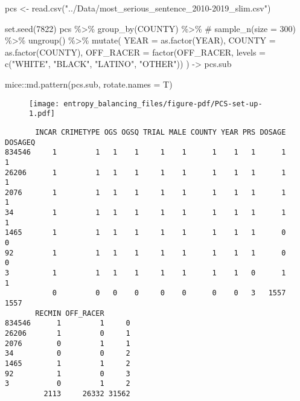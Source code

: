 \documentclass[
  letterpaper,
  DIV=11,
  numbers=noendperiod]{scrartcl}
\newenvironment{Shaded}{\begin{snugshade}}{\end{snugshade}}
\newcommand{\AttributeTok}[1]{\textcolor[rgb]{0.40,0.45,0.13}{#1}}
\newcommand{\CommentTok}[1]{\textcolor[rgb]{0.37,0.37,0.37}{#1}}
\newcommand{\DecValTok}[1]{\textcolor[rgb]{0.68,0.00,0.00}{#1}}
\newcommand{\FunctionTok}[1]{\textcolor[rgb]{0.28,0.35,0.67}{#1}}
\newcommand{\NormalTok}[1]{\textcolor[rgb]{0.00,0.23,0.31}{#1}}
\newcommand{\OtherTok}[1]{\textcolor[rgb]{0.00,0.23,0.31}{#1}}
\newcommand{\SpecialCharTok}[1]{\textcolor[rgb]{0.37,0.37,0.37}{#1}}
\newcommand{\StringTok}[1]{\textcolor[rgb]{0.13,0.47,0.30}{#1}}
\begin{document}
\begin{Shaded}
\begin{Highlighting}[]
\NormalTok{pcs }\OtherTok{\textless{}{-}} \FunctionTok{read.csv}\NormalTok{(}\StringTok{"../Data/most\_serious\_sentence\_2010{-}2019\_slim.csv"}\NormalTok{)}

\FunctionTok{set.seed}\NormalTok{(}\DecValTok{7822}\NormalTok{)}
\NormalTok{pcs }\SpecialCharTok{\%\textgreater{}\%}
    \FunctionTok{group\_by}\NormalTok{(COUNTY) }\SpecialCharTok{\%\textgreater{}\%}
    \CommentTok{\# sample\_n(size = 300) \%\textgreater{}\%}
    \FunctionTok{ungroup}\NormalTok{() }\SpecialCharTok{\%\textgreater{}\%}
    \FunctionTok{mutate}\NormalTok{(}
        \AttributeTok{YEAR =} \FunctionTok{as.factor}\NormalTok{(YEAR),}
        \AttributeTok{COUNTY =} \FunctionTok{as.factor}\NormalTok{(COUNTY),}
        \AttributeTok{OFF\_RACER =} \FunctionTok{factor}\NormalTok{(OFF\_RACER, }\AttributeTok{levels =} \FunctionTok{c}\NormalTok{(}\StringTok{"WHITE"}\NormalTok{, }\StringTok{"BLACK"}\NormalTok{, }\StringTok{"LATINO"}\NormalTok{, }\StringTok{"OTHER"}\NormalTok{))}
\NormalTok{        ) }\OtherTok{{-}\textgreater{}}\NormalTok{ pcs.sub}

\NormalTok{mice}\SpecialCharTok{::}\FunctionTok{md.pattern}\NormalTok{(pcs.sub, }\AttributeTok{rotate.names =}\NormalTok{ T)}
\end{Highlighting}
\end{Shaded}

\begin{figure}[H]

{\centering \texttt{[image: entropy\_balancing\_files/figure-pdf/PCS-set-up-1.pdf]}

}

\end{figure}

\begin{verbatim}
       INCAR CRIMETYPE OGS OGSQ TRIAL MALE COUNTY YEAR PRS DOSAGE DOSAGEQ
834546     1         1   1    1     1    1      1    1   1      1       1
26206      1         1   1    1     1    1      1    1   1      1       1
2076       1         1   1    1     1    1      1    1   1      1       1
34         1         1   1    1     1    1      1    1   1      1       1
1465       1         1   1    1     1    1      1    1   1      0       0
92         1         1   1    1     1    1      1    1   1      0       0
3          1         1   1    1     1    1      1    1   0      1       1
           0         0   0    0     0    0      0    0   3   1557    1557
       RECMIN OFF_RACER      
834546      1         1     0
26206       1         0     1
2076        0         1     1
34          0         0     2
1465        1         1     2
92          1         0     3
3           0         1     2
         2113     26332 31562
\end{verbatim}
\end{document}
